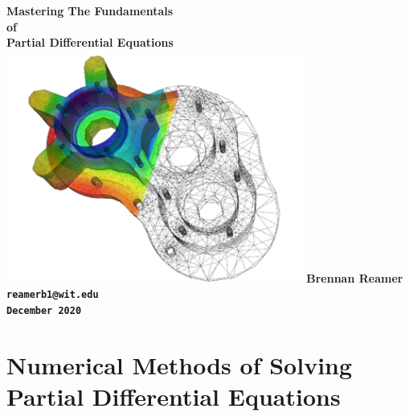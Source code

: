 \documentclass{article}
\begin{document}
\begin{titlepage}
\begin{center}
\bfseries
\huge Mastering The Fundamentals \\  of \\ Partial Differential Equations \\[.5in]
\vfill
\includegraphics[height=3in]{img}
\vfill
\LARGE Brennan Reamer \\[.2in]
\texttt{reamerb1@wit.edu}\\
\texttt{December 2020}
\end{center}      
\end{titlepage}
\newpage
\tableofcontents
\newpage
\section{Numerical Methods of Solving Partial Differential Equations}
\end{document}

